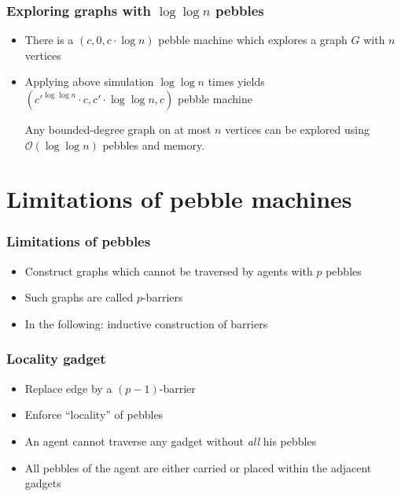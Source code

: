 \documentclass{beamer}
\begin{document}
\begin{frame}
  \frametitle{Exploring graphs with $\log\log n$ pebbles}
  \begin{itemize}
    \item There is a $(c,0,c\cdot\log n)$ pebble machine which explores
      a graph $G$ with $n$ vertices
    \item Applying above simulation $\log \log n$ times yields
      $(c'^{\log\log n}\cdot c, c'\cdot\log\log n, c)$ pebble machine
      \begin{theorem}
        Any bounded-degree graph on at most $n$ vertices can be explored using
        $\mathcal{O}(\log\log n)$ pebbles and memory.
      \end{theorem}
  \end{itemize}
\end{frame}

\section{Limitations of pebble machines}
\begin{frame}
  \frametitle{Limitations of pebbles}
  \begin{itemize}
    \item Construct graphs which cannot be traversed by agents with $p$ pebbles
    \item Such graphs are called $p$-barriers
      \begin{center}
        \resizebox{0.3\textwidth}{!}{}
      \end{center}
    \item In the following: inductive construction of barriers
  \end{itemize}
\end{frame}

\begin{frame}
  \frametitle{Locality gadget}
  \begin{itemize}
    \item Replace edge by a $(p-1)$-barrier
    \item Enforce \enquote{locality} of pebbles
    \item An agent cannot traverse any gadget without \emph{all} his pebbles
    \item All pebbles of the agent are either carried or placed within the
      adjacent gadgets
  \end{itemize}
  \begin{center}
  \end{center}
\end{frame}
\end{document}
